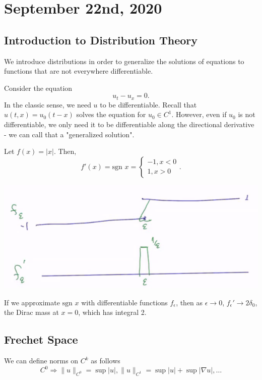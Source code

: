 \documentclass[11pt]{scrartcl}
\begin{document}
\section{September 22nd, 2020}
\subsection{Introduction to Distribution Theory}
We introduce distributions in order to generalize the solutions of equations to functions that are not everywhere differentiable. 
\begin{example}
Consider the equation
$$u_t - u_x = 0.$$
In the classic sense, we need $u$ to be differentiable.  Recall that $u(t, x) = u_0(t-x)$ solves the equation for $u_0 \in C^1$.  However, even if $u_0$ is not differentiable, we only need it to be differentiable along the directional derivative - we can call that a "generalized solution".
\end{example}

\begin{example} Let $f(x) = |x|$.  Then, $$f'(x) = \text{sgn } x = \begin{cases} -1, x < 0\\ 1, x > 0
\end{cases}.$$
\begin{center}
\includegraphics[scale=0.5]{images/dist.png}
\end{center}
If we approximate $\text{sgn } x$ with differentiable functions $f_\epsilon$, then as $\epsilon \rightarrow 0$, $f_\epsilon' \rightarrow 2\delta_0$, the Dirac mass at $x = 0$, which has integral 2.
\end{example}

\subsection{Frechet Space}
We can define norms on $C^k$ as follows
$$C^0 \Rightarrow \|u\|_{C^0} = \sup |u|, \|u\|_{C^1} = \sup|u| + \sup|\nabla u|, \dots$$
\end{document}

